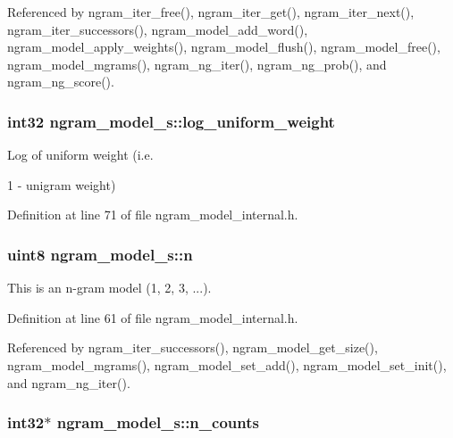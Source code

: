 \-Referenced by ngram\-\_\-iter\-\_\-free(), ngram\-\_\-iter\-\_\-get(), ngram\-\_\-iter\-\_\-next(), ngram\-\_\-iter\-\_\-successors(), ngram\-\_\-model\-\_\-add\-\_\-word(), ngram\-\_\-model\-\_\-apply\-\_\-weights(), ngram\-\_\-model\-\_\-flush(), ngram\-\_\-model\-\_\-free(), ngram\-\_\-model\-\_\-mgrams(), ngram\-\_\-ng\-\_\-iter(), ngram\-\_\-ng\-\_\-prob(), and ngram\-\_\-ng\-\_\-score().

\subsubsection[{log\-\_\-uniform\-\_\-weight}]{\setlength{\rightskip}{0pt plus 5cm}int32 {\bf ngram\-\_\-model\-\_\-s\-::log\-\_\-uniform\-\_\-weight}}\label{structngram__model__s_aa38c5fdecaefd9a2f43b69f26ae492c1}


\-Log of uniform weight (i.\-e. 

1 -\/ unigram weight) 

\-Definition at line 71 of file ngram\-\_\-model\-\_\-internal.\-h.

\subsubsection[{n}]{\setlength{\rightskip}{0pt plus 5cm}uint8 {\bf ngram\-\_\-model\-\_\-s\-::n}}\label{structngram__model__s_a3c87bc1b678662a2c8930b3b8c33a80f}


\-This is an n-\/gram model (1, 2, 3, ...). 



\-Definition at line 61 of file ngram\-\_\-model\-\_\-internal.\-h.



\-Referenced by ngram\-\_\-iter\-\_\-successors(), ngram\-\_\-model\-\_\-get\-\_\-size(), ngram\-\_\-model\-\_\-mgrams(), ngram\-\_\-model\-\_\-set\-\_\-add(), ngram\-\_\-model\-\_\-set\-\_\-init(), and ngram\-\_\-ng\-\_\-iter().

\subsubsection[{n\-\_\-counts}]{\setlength{\rightskip}{0pt plus 5cm}int32$\ast$ {\bf ngram\-\_\-model\-\_\-s\-::n\-\_\-counts}}\label{structngram__model__s_a9dcba9b49cc1cd189b257e5838da0eee}


